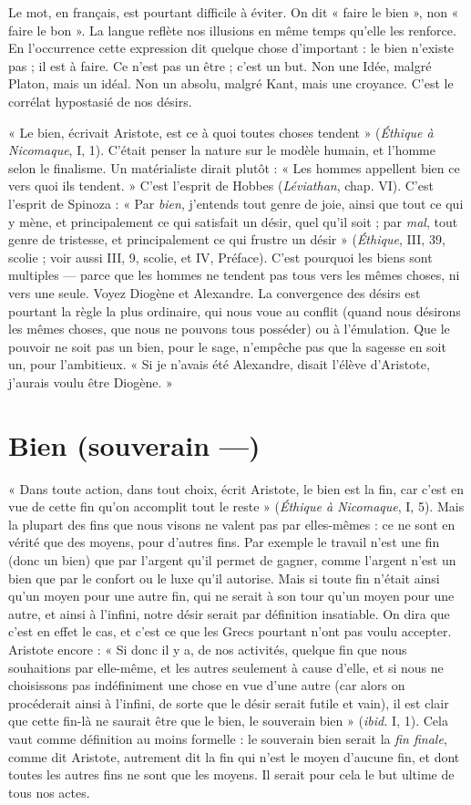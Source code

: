 Le mot, en français, est pourtant difficile à éviter. On dit « faire le bien »,
non « faire le bon ». La langue reflète nos illusions en même temps qu’elle les
renforce. En l’occurrence cette expression dit quelque chose d’important : le
bien n'existe pas ; il est à faire. Ce n’est pas un être ; c’est un but. Non une
Idée, malgré Platon, mais un idéal. Non un absolu, malgré Kant, mais une
croyance. C’est le corrélat hypostasié de nos désirs.

« Le bien, écrivait Aristote, est ce à quoi toutes choses tendent » ({\it Éthique à
Nicomaque}, I, 1). C'était penser la nature sur le modèle humain, et l’homme
selon le finalisme. Un matérialiste dirait plutôt : « Les hommes appellent bien
ce vers quoi ils tendent. » C’est l’esprit de Hobbes ({\it Léviathan}, chap. VI). C’est
l'esprit de Spinoza : « Par {\it bien}, j'entends tout genre de joie, ainsi que tout ce
qui y mène, et principalement ce qui satisfait un désir, quel qu’il soit ; par {\it mal},
tout genre de tristesse, et principalement ce qui frustre un désir » ({\it Éthique}, III,
39, scolie ; voir aussi III, 9, scolie, et IV, Préface). C’est pourquoi les biens sont
multiples — parce que les hommes ne tendent pas tous vers les mêmes choses,
ni vers une seule. Voyez Diogène et Alexandre. La convergence des désirs est
pourtant la règle la plus ordinaire, qui nous voue au conflit (quand nous désirons
les mêmes choses, que nous ne pouvons tous posséder) ou à l’émulation.
Que le pouvoir ne soit pas un bien, pour le sage, n'empêche pas que la sagesse
en soit un, pour l’ambitieux. « Si je n’avais été Alexandre, disait l'élève d’Aristote,
j'aurais voulu être Diogène. »

\section{Bien (souverain —)}
« Dans toute action, dans tout choix, écrit Aristote,
le bien est la fin, car c’est en vue de cette fin qu’on
accomplit tout le reste » ({\it Éthique à Nicomaque}, I, 5). Mais la plupart des fins
que nous visons ne valent pas par elles-mêmes : ce ne sont en vérité que des
moyens, pour d’autres fins. Par exemple le travail n’est une fin (donc un bien)
que par l’argent qu’il permet de gagner, comme l'argent n’est un bien que par
le confort ou le luxe qu’il autorise. Mais si toute fin n’était ainsi qu’un moyen
pour une autre fin, qui ne serait à son tour qu’un moyen pour une autre, et
ainsi à l'infini, notre désir serait par définition insatiable. On dira que c’est en
effet le cas, et c’est ce que les Grecs pourtant n’ont pas voulu accepter. Aristote
encore : « Si donc il y a, de nos activités, quelque fin que nous souhaitions par
elle-même, et les autres seulement à cause d’elle, et si nous ne choisissons pas
indéfiniment une chose en vue d’une autre (car alors on procéderait ainsi à
l'infini, de sorte que le désir serait futile et vain), il est clair que cette fin-là ne
saurait être que le bien, le souverain bien » ({\it ibid.} I, 1). Cela vaut comme définition
au moins formelle : le souverain bien serait la {\it fin finale}, comme dit Aristote,
autrement dit la fin qui n’est le moyen d’aucune fin, et dont toutes les
autres fins ne sont que les moyens. Il serait pour cela le but ultime de tous nos
actes.

